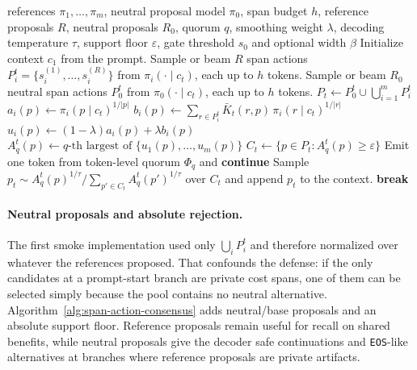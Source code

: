 \documentclass[11pt]{article}
\begin{document}
\begin{algorithm}[htbp]
\caption{Span-action consensus with neutral proposals}
\label{alg:span-action-consensus}
\begin{algorithmic}[1]
\Require references $\pi_1,\dots,\pi_m$, neutral proposal model $\pi_0$, span budget $h$, reference proposals $R$, neutral proposals $R_0$, quorum $q$, smoothing weight $\lambda$, decoding temperature $\tau$, support floor $\varepsilon$, gate threshold $s_0$ and optional width $\beta$
\State Initialize context $c_1$ from the prompt.
        \State Sample or beam $R$ span actions $P_i^t=\{s_i^{(1)},\dots,s_i^{(R)}\}$ from $\pi_i(\cdot\mid c_t)$, each up to $h$ tokens.
    \EndFor
    \State Sample or beam $R_0$ neutral span actions $P_0^t$ from $\pi_0(\cdot\mid c_t)$, each up to $h$ tokens.
    \State $P_t\gets P_0^t\cup\bigcup_{i=1}^m P_i^t$ 
        \State $a_i(p)\gets\pi_i(p\mid c_t)^{1/|p|}$ 
        \State $b_i(p)\gets\sum_{r\in P_i^t} \bar K_t(r,p)\,\pi_i(r\mid c_t)^{1/|r|}$ 
        \State $u_i(p)\gets(1-\lambda)a_i(p)+\lambda b_i(p)$
    \EndFor
        \State $A_q^t(p)\gets q\text{-th largest of }\{u_1(p),\dots,u_m(p)\}$
    \EndFor
    \State $C_t\gets\{p\in P_t:A_q^t(p)\ge \varepsilon\}$
        \State Emit one token from token-level quorum $\Phi_q$ and \textbf{continue}
    \EndIf
    \State Sample $p_t\sim A_q^t(p)^{1/\tau}/\sum_{p'\in C_t}A_q^t(p')^{1/\tau}$ over $C_t$ and append $p_t$ to the context.
        \State \textbf{break}
    \EndIf
\EndFor
\end{algorithmic}
\end{algorithm}

\paragraph{Neutral proposals and absolute rejection.} The first smoke implementation used only $\bigcup_i P_i^t$ and therefore normalized over whatever the references proposed. That confounds the defense: if the only candidates at a prompt-start branch are private cost spans, one of them can be selected simply because the pool contains no neutral alternative. Algorithm~\ref{alg:span-action-consensus} adds neutral/base proposals and an absolute support floor. Reference proposals remain useful for recall on shared benefits, while neutral proposals give the decoder safe continuations and \texttt{EOS}-like alternatives at branches where reference proposals are private artifacts.
\end{document}
